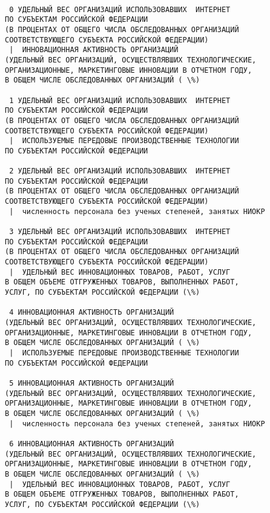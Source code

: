 \documentclass[11pt]{article}
\begin{document}
    \begin{Verbatim}[commandchars=\\\{\}]

 0 УДЕЛЬНЫЙ ВЕС ОРГАНИЗАЦИЙ ИСПОЛЬЗОВАВШИХ  ИНТЕРНЕТ
ПО СУБЪЕКТАМ РОССИЙСКОЙ ФЕДЕРАЦИИ
(В ПРОЦЕНТАХ ОТ ОБЩЕГО ЧИСЛА ОБСЛЕДОВАННЫХ ОРГАНИЗАЦИЙ
СООТВЕТСТВУЮЩЕГО СУБЪЕКТА РОССИЙСКОЙ ФЕДЕРАЦИИ) 
 |  ИННОВАЦИОННАЯ АКТИВНОСТЬ ОРГАНИЗАЦИЙ
(УДЕЛЬНЫЙ ВЕС ОРГАНИЗАЦИЙ, ОСУЩЕСТВЛЯВШИХ ТЕХНОЛОГИЧЕСКИЕ,
ОРГАНИЗАЦИОННЫЕ, МАРКЕТИНГОВЫЕ ИННОВАЦИИ В ОТЧЕТНОМ ГОДУ,
В ОБЩЕМ ЧИСЛЕ ОБСЛЕДОВАННЫХ ОРГАНИЗАЦИЙ ( \%)

 1 УДЕЛЬНЫЙ ВЕС ОРГАНИЗАЦИЙ ИСПОЛЬЗОВАВШИХ  ИНТЕРНЕТ
ПО СУБЪЕКТАМ РОССИЙСКОЙ ФЕДЕРАЦИИ
(В ПРОЦЕНТАХ ОТ ОБЩЕГО ЧИСЛА ОБСЛЕДОВАННЫХ ОРГАНИЗАЦИЙ
СООТВЕТСТВУЮЩЕГО СУБЪЕКТА РОССИЙСКОЙ ФЕДЕРАЦИИ) 
 |  ИСПОЛЬЗУЕМЫЕ ПЕРЕДОВЫЕ ПРОИЗВОДСТВЕННЫЕ ТЕХНОЛОГИИ
ПО СУБЪЕКТАМ РОССИЙСКОЙ ФЕДЕРАЦИИ

 2 УДЕЛЬНЫЙ ВЕС ОРГАНИЗАЦИЙ ИСПОЛЬЗОВАВШИХ  ИНТЕРНЕТ
ПО СУБЪЕКТАМ РОССИЙСКОЙ ФЕДЕРАЦИИ
(В ПРОЦЕНТАХ ОТ ОБЩЕГО ЧИСЛА ОБСЛЕДОВАННЫХ ОРГАНИЗАЦИЙ
СООТВЕТСТВУЮЩЕГО СУБЪЕКТА РОССИЙСКОЙ ФЕДЕРАЦИИ) 
 |  численность персонала без ученых степеней, занятых НИОКР

 3 УДЕЛЬНЫЙ ВЕС ОРГАНИЗАЦИЙ ИСПОЛЬЗОВАВШИХ  ИНТЕРНЕТ
ПО СУБЪЕКТАМ РОССИЙСКОЙ ФЕДЕРАЦИИ
(В ПРОЦЕНТАХ ОТ ОБЩЕГО ЧИСЛА ОБСЛЕДОВАННЫХ ОРГАНИЗАЦИЙ
СООТВЕТСТВУЮЩЕГО СУБЪЕКТА РОССИЙСКОЙ ФЕДЕРАЦИИ) 
 |  УДЕЛЬНЫЙ ВЕС ИННОВАЦИОННЫХ ТОВАРОВ, РАБОТ, УСЛУГ
В ОБЩЕМ ОБЪЕМЕ ОТГРУЖЕННЫХ ТОВАРОВ, ВЫПОЛНЕННЫХ РАБОТ,
УСЛУГ, ПО СУБЪЕКТАМ РОССИЙСКОЙ ФЕДЕРАЦИИ (\%)

 4 ИННОВАЦИОННАЯ АКТИВНОСТЬ ОРГАНИЗАЦИЙ
(УДЕЛЬНЫЙ ВЕС ОРГАНИЗАЦИЙ, ОСУЩЕСТВЛЯВШИХ ТЕХНОЛОГИЧЕСКИЕ,
ОРГАНИЗАЦИОННЫЕ, МАРКЕТИНГОВЫЕ ИННОВАЦИИ В ОТЧЕТНОМ ГОДУ,
В ОБЩЕМ ЧИСЛЕ ОБСЛЕДОВАННЫХ ОРГАНИЗАЦИЙ ( \%) 
 |  ИСПОЛЬЗУЕМЫЕ ПЕРЕДОВЫЕ ПРОИЗВОДСТВЕННЫЕ ТЕХНОЛОГИИ
ПО СУБЪЕКТАМ РОССИЙСКОЙ ФЕДЕРАЦИИ

 5 ИННОВАЦИОННАЯ АКТИВНОСТЬ ОРГАНИЗАЦИЙ
(УДЕЛЬНЫЙ ВЕС ОРГАНИЗАЦИЙ, ОСУЩЕСТВЛЯВШИХ ТЕХНОЛОГИЧЕСКИЕ,
ОРГАНИЗАЦИОННЫЕ, МАРКЕТИНГОВЫЕ ИННОВАЦИИ В ОТЧЕТНОМ ГОДУ,
В ОБЩЕМ ЧИСЛЕ ОБСЛЕДОВАННЫХ ОРГАНИЗАЦИЙ ( \%) 
 |  численность персонала без ученых степеней, занятых НИОКР

 6 ИННОВАЦИОННАЯ АКТИВНОСТЬ ОРГАНИЗАЦИЙ
(УДЕЛЬНЫЙ ВЕС ОРГАНИЗАЦИЙ, ОСУЩЕСТВЛЯВШИХ ТЕХНОЛОГИЧЕСКИЕ,
ОРГАНИЗАЦИОННЫЕ, МАРКЕТИНГОВЫЕ ИННОВАЦИИ В ОТЧЕТНОМ ГОДУ,
В ОБЩЕМ ЧИСЛЕ ОБСЛЕДОВАННЫХ ОРГАНИЗАЦИЙ ( \%) 
 |  УДЕЛЬНЫЙ ВЕС ИННОВАЦИОННЫХ ТОВАРОВ, РАБОТ, УСЛУГ
В ОБЩЕМ ОБЪЕМЕ ОТГРУЖЕННЫХ ТОВАРОВ, ВЫПОЛНЕННЫХ РАБОТ,
УСЛУГ, ПО СУБЪЕКТАМ РОССИЙСКОЙ ФЕДЕРАЦИИ (\%)


\end{Verbatim}
\end{document}

